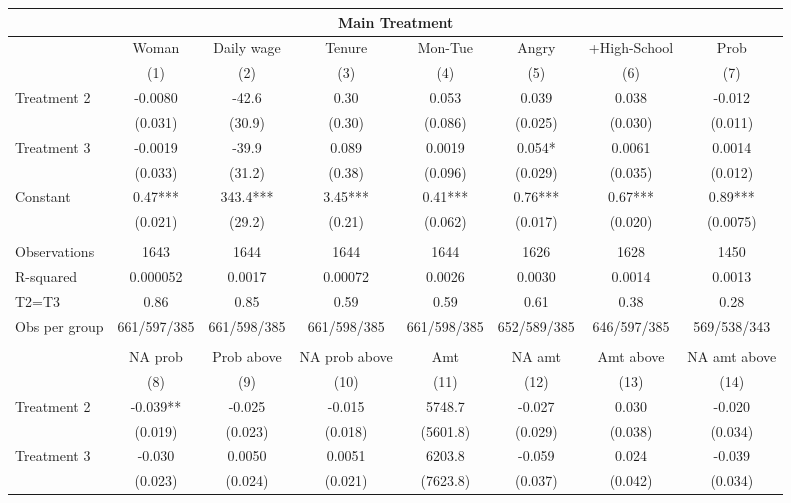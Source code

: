\begin{tabular}{lccccccc}
\toprule
\multicolumn{8}{c}{Main Treatment} \\
\midrule
\midrule
      & Woman  & Daily wage & Tenure & Mon-Tue & Angry & +High-School & Prob \\
\midrule
\midrule
      & (1)   & (2)   & (3)   & (4)   & (5)   & (6)   & (7) \\
\midrule
Treatment 2 & -0.0080 & -42.6 & 0.30  & 0.053 & 0.039 & 0.038 & -0.012 \\
      & (0.031) & (30.9) & (0.30) & (0.086) & (0.025) & (0.030) & (0.011) \\
Treatment 3 & -0.0019 & -39.9 & 0.089 & 0.0019 & 0.054* & 0.0061 & 0.0014 \\
      & (0.033) & (31.2) & (0.38) & (0.096) & (0.029) & (0.035) & (0.012) \\
Constant  & 0.47*** & 343.4*** & 3.45*** & 0.41*** & 0.76*** & 0.67*** & 0.89*** \\
      & (0.021) & (29.2) & (0.21) & (0.062) & (0.017) & (0.020) & (0.0075) \\
      &       &       &       &       &       &       &  \\
\midrule
Observations & 1643  & 1644  & 1644  & 1644  & 1626  & 1628  & 1450 \\
R-squared & 0.000052 & 0.0017 & 0.00072 & 0.0026 & 0.0030 & 0.0014 & 0.0013 \\
T2=T3 & 0.86  & 0.85  & 0.59  & 0.59  & 0.61  & 0.38  & 0.28 \\
Obs per group & 661/597/385 & 661/598/385 & 661/598/385 & 661/598/385 & 652/589/385 & 646/597/385 & 569/538/343 \\
\midrule
\midrule
      &       &       &       &       &       &       &  \\
      & NA prob & Prob above & NA prob above & Amt   & NA amt & Amt above & NA amt above \\
\midrule
\midrule
      & (8)   & (9)   & (10)  & (11)  & (12)  & (13)  & (14) \\
\midrule
Treatment 2 & -0.039** & -0.025 & -0.015 & 5748.7 & -0.027 & 0.030 & -0.020 \\
      & (0.019) & (0.023) & (0.018) & (5601.8) & (0.029) & (0.038) & (0.034) \\
Treatment 3 & -0.030 & 0.0050 & 0.0051 & 6203.8 & -0.059 & 0.024 & -0.039 \\
      & (0.023) & (0.024) & (0.021) & (7623.8) & (0.037) & (0.042) & (0.034) \\

\end{tabular}

